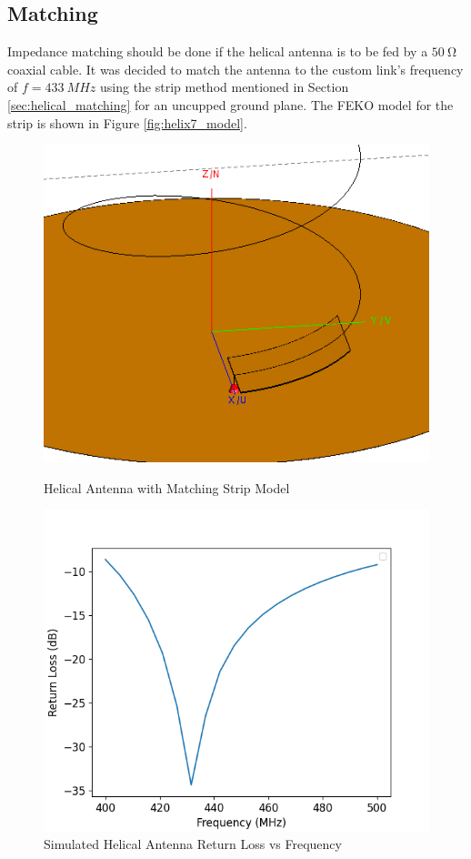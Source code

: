 \subsection{Matching}
Impedance matching should be done if the helical antenna is to be fed by a $\SI{50}{\ohm}$ coaxial cable. It was decided to match the antenna to the custom link's frequency of $f = \SI{433}{MHz}$ using the strip method mentioned in Section \ref{sec:helical_matching} for an uncupped ground plane. The FEKO model for the strip is shown in Figure \ref{fig:helix7_model}.


\begin{figure}[!htb]
  \begin{minipage}{.4\textwidth}
    \centering
    \includegraphics[width=0.95\linewidth]{helix7_model}
    \caption{Helical Antenna with Matching Strip Model}
    \label{fig:helix7_model}
  \end{minipage}
  \begin{minipage}{.58\textwidth}
    \centering
    \includegraphics[width=0.9\linewidth]{helix7_returnLoss}
    \caption{Simulated Helical Antenna Return Loss vs Frequency}
    \label{fig:helix7_returnLoss}
  \end{minipage}
\end{figure}

